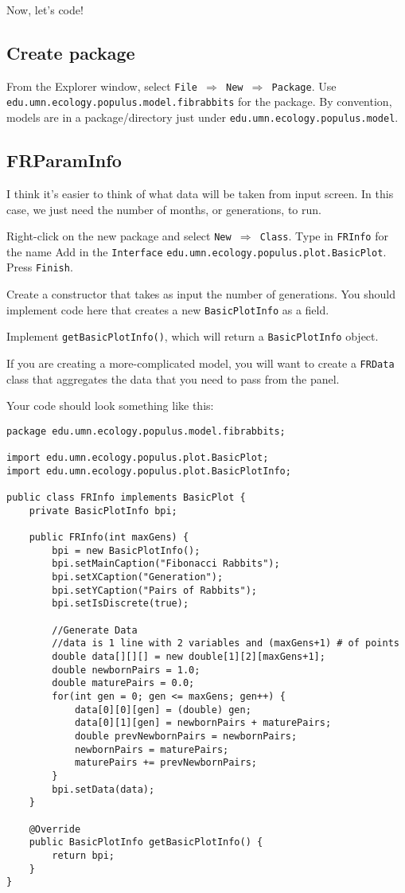 \documentclass[12pt]{article}
\begin{document}
Now, let's code!

\subsection{Create package}
From the Explorer window, select \texttt{File $\Rightarrow$ New $\Rightarrow$ Package}.
Use \texttt{edu.umn.ecology.populus.model.fibrabbits} for the package.  By convention, models are in a package/directory just under \texttt{edu.umn.ecology.populus.model}.

\subsection{FRParamInfo}
I think it's easier to think of what data will be taken from input screen.  In this case, we just need the number of months, or generations, to run.

Right-click on the new package and select \texttt{New $\Rightarrow$ Class}.
Type in \texttt{FRInfo} for the name
Add in the \texttt{Interface} \texttt{edu.umn.ecology.populus.plot.BasicPlot}.
Press \texttt{Finish}.

Create a constructor that takes as input the number of generations.  You should implement code here that creates a new \texttt{BasicPlotInfo} as a field.

Implement \texttt{getBasicPlotInfo()}, which will return a \texttt{BasicPlotInfo} object.

If you are creating a more-complicated model, you will want to create a \texttt{FRData} class that aggregates the data that you need to pass from the panel.

Your code should look something like this:

\begin{verbatim}
package edu.umn.ecology.populus.model.fibrabbits;

import edu.umn.ecology.populus.plot.BasicPlot;
import edu.umn.ecology.populus.plot.BasicPlotInfo;

public class FRInfo implements BasicPlot {
    private BasicPlotInfo bpi;

    public FRInfo(int maxGens) {
        bpi = new BasicPlotInfo();
        bpi.setMainCaption("Fibonacci Rabbits");
        bpi.setXCaption("Generation");
        bpi.setYCaption("Pairs of Rabbits");
        bpi.setIsDiscrete(true);
		
        //Generate Data
        //data is 1 line with 2 variables and (maxGens+1) # of points
        double data[][][] = new double[1][2][maxGens+1]; 
        double newbornPairs = 1.0;
        double maturePairs = 0.0;
        for(int gen = 0; gen <= maxGens; gen++) {
            data[0][0][gen] = (double) gen;
            data[0][1][gen] = newbornPairs + maturePairs;
            double prevNewbornPairs = newbornPairs;
            newbornPairs = maturePairs;
            maturePairs += prevNewbornPairs;
        }
        bpi.setData(data);
    }
	
    @Override
    public BasicPlotInfo getBasicPlotInfo() {
        return bpi;
    }
}
\end{verbatim}
\end{document}
